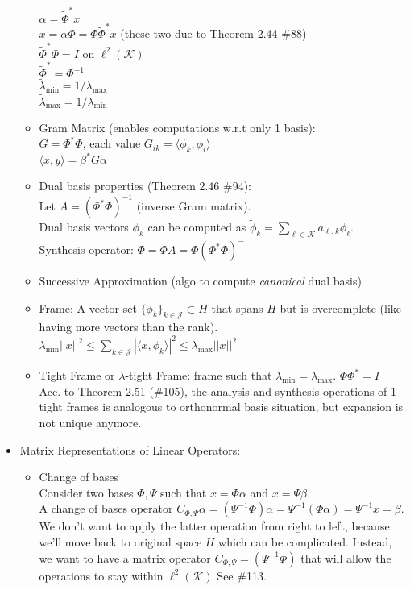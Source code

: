 \documentclass{article}
\newcommand{\la}{\langle}
\newcommand{\ra}{\rangle}
\begin{document}
\begin{itemize}
\begin{itemize}
 	{\footnotesize\color{gray}
 	$\alpha=\tilde{\Phi}^{*}x$ \\
 	$x=\alpha\Phi=\Phi\tilde{\Phi}^{*}x$ (these two due to Theorem 2.44 \#88) \\
 	$\tilde{\Phi}^{*}\Phi=I$ on $\ell^2(\mathcal{K})$ \\
 	$\tilde{\Phi}^{*}=\Phi^{-1}$ \\
 	$\tilde{\lambda}_{\min}=1/\lambda_{\max}$ \\
 	$\tilde{\lambda}_{\max}=1/\lambda_{\min}$
 	}
 	\item Gram Matrix (enables computations w.r.t only 1 basis): \\
 	{\footnotesize \color{gray}
 	$G=\Phi^{*}\Phi$, each value $G_{ik}=\la \phi_k, \phi_i \ra$ \\
 	$\la x,y \ra = \beta^{*}G\alpha$
 	}
 	\item Dual basis properties (Theorem 2.46 \#94): \\
 	{\footnotesize\color{gray}
 	Let $A=(\Phi^{*}\Phi)^{-1}$ (inverse Gram matrix). \\
 	Dual basis vectors $\phi_k$ can be computed as $\tilde{\phi}_k=\sum_{\ell\in\mathcal{K}}a_{\ell,k}\phi_{\ell}$. \\
 	Synthesis operator: $\tilde{\Phi}=\Phi A = \Phi (\Phi^{*}\Phi)^{-1}$
 	}
 	\item Successive Approximation (algo to compute \textit{canonical} dual basis)
 	\item Frame: A vector set $\{\phi_k\}_{k\in\mathcal{J}}\subset H$ that spans $H$ but is overcomplete (like having more vectors than the rank).\\
 	{
 	\footnotesize\color{gray} $\lambda_{\min}||x||^2 \le \sum_{k\in\mathcal{J}}|\la x, \phi_k\ra|^2\le \lambda_{\max}||x||^2$
 	}
 	\item Tight Frame or $\lambda$-tight Frame: frame such that  $\lambda_{\min}=\lambda_{\max}$. 
 	{ \footnotesize\color{gray}
 	$\Phi\Phi^{*}=I$ \\
 	Acc. to Theorem 2.51 (\#105), the analysis and synthesis operations of 1-tight frames is analogous to orthonormal basis situation, but expansion is not unique anymore.
 	}
 	\end{itemize}
 	\item Matrix Representations of Linear Operators:
 	\begin{itemize}
 		\item Change of bases \\
 		{\footnotesize\color{gray}
 		Consider two bases $\Phi, \Psi$ such that $x=\Phi\alpha$ and $x=\Psi\beta$\\
 		A change of bases operator $C_{\Phi,\Psi}\alpha=(\Psi^{-1}\Phi)\alpha=\Psi^{-1}(\Phi\alpha)=\Psi^{-1}x=\beta$. \\
 		We don't want to apply the latter operation from right to left, because we'll move back to original space $H$ which can be complicated. Instead, we want to have a matrix operator $C_{\Phi,\Psi}=(\Psi^{-1}\Phi)$ that will allow the operations to stay within $\ell^2(\mathcal{K})$ See \#113. }
 	\end{itemize}

\end{itemize}
\end{document}
